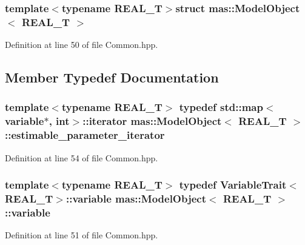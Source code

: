 \subsubsection*{template$<$typename R\-E\-A\-L\-\_\-\-T$>$struct mas\-::\-Model\-Object$<$ R\-E\-A\-L\-\_\-\-T $>$}



Definition at line 50 of file Common.\-hpp.



\subsection{Member Typedef Documentation}
\hypertarget{structmas_1_1_model_object_af95a47b3862d83583751c2d835887697}{
\subsubsection[{estimable\-\_\-parameter\-\_\-iterator}]{\setlength{\rightskip}{0pt plus 5cm}template$<$typename R\-E\-A\-L\-\_\-\-T$>$ typedef std\-::map$<${\bf variable}$\ast$, int$>$\-::iterator {\bf mas\-::\-Model\-Object}$<$ R\-E\-A\-L\-\_\-\-T $>$\-::{\bf estimable\-\_\-parameter\-\_\-iterator}}}\label{structmas_1_1_model_object_af95a47b3862d83583751c2d835887697}


Definition at line 54 of file Common.\-hpp.

\hypertarget{structmas_1_1_model_object_a4e62fdbb5826f8fac311262b888ab10a}{
\subsubsection[{variable}]{\setlength{\rightskip}{0pt plus 5cm}template$<$typename R\-E\-A\-L\-\_\-\-T$>$ typedef {\bf Variable\-Trait}$<$R\-E\-A\-L\-\_\-\-T$>$\-::{\bf variable} {\bf mas\-::\-Model\-Object}$<$ R\-E\-A\-L\-\_\-\-T $>$\-::{\bf variable}}}\label{structmas_1_1_model_object_a4e62fdbb5826f8fac311262b888ab10a}


Definition at line 51 of file Common.\-hpp.



